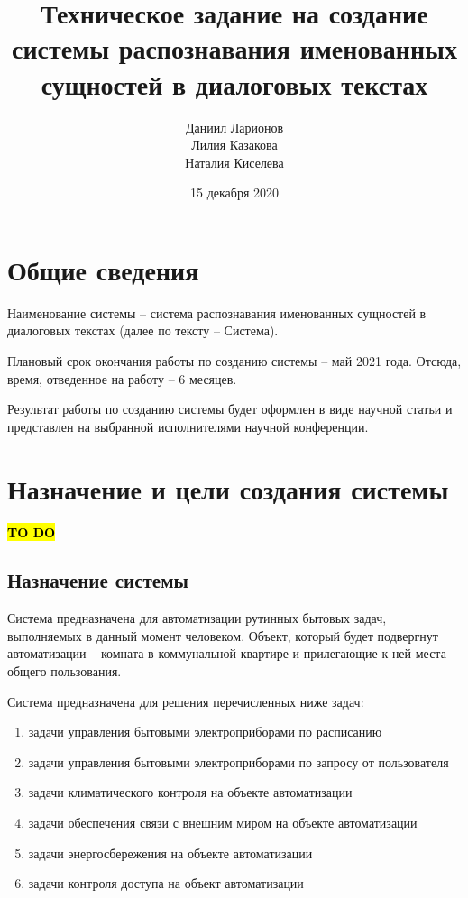 \documentclass[a4paper, 12pt, titlepage]{article}
\begin{document}
\author{
    Даниил Ларионов \\
    Лилия Казакова \\
    Наталия Киселева
}
\title{Техническое задание на создание системы распознавания именованных сущностей в диалоговых текстах}
\date{15 декабря 2020}
\pagebreak
\maketitle

\tableofcontents
\pagebreak
\section{Общие сведения}
Наименование системы -- система распознавания именованных сущностей в диалоговых текстах (далее по тексту -- 
Система).

Плановый срок окончания работы по созданию системы -- май 2021 года. 
Отсюда, время, отведенное на работу -- 6 месяцев.

Результат работы по созданию системы будет оформлен в виде научной статьи и представлен на выбранной исполнителями научной конференции.


\section{Назначение и цели создания системы}

\hl{\bf TO DO}
\subsection{Назначение системы}

Система предназначена для автоматизации рутинных бытовых задач, выполняемых 
в данный момент человеком. Объект, который будет подвергнут автоматизации -- 
комната в коммунальной квартире и прилегающие к ней места общего пользования.

Система предназначена для решения перечисленных ниже задач:
\begin{enumerate}
\item задачи управления бытовыми электроприборами по расписанию
\item задачи управления бытовыми электроприборами по запросу от пользователя
\item задачи климатического контроля на объекте автоматизации
\item задачи обеспечения связи с внешним миром на объекте автоматизации
\item задачи энергосбережения на объекте автоматизации
\item задачи контроля доступа на объект автоматизации
\end{enumerate}
\end{document}

